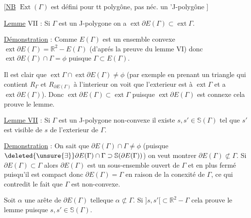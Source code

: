 [\uline{NB} $\operatorname{Ext}(\Gamma)$ est défini pour tt polygône, pas néc. un 'J-polygône ]

\uline{Lemme} VII : Si $\Gamma$ est un J-polygone on a $\operatorname{ext}\partial E(\Gamma)\subset\operatorname{ext}\Gamma$.

\uline{Démonstration} : Comme $E(\Gamma)$ est un ensemble convexe $\operatorname{ext}\partial E(\Gamma)=\mathbb{R}^{2}-E(\Gamma)$ (d'aprés la preuve du lemme VI) donc $\operatorname{ext}\partial E(\Gamma)\cap\Gamma=\phi$ puisque $\Gamma\subset E(\Gamma)$.

Il est clair que $\operatorname{ext}\Gamma\cap\operatorname{ext}\partial E(\Gamma)\ne\phi$ (par exemple en prenant un triangle qui contient $R_{\Gamma}$ et $R_{\partial E(\Gamma)}$ à l'interieur on voit que l'exterieur est  à  $\operatorname{ext}\Gamma$ et a $\operatorname{ext}\partial E(\Gamma)$). Donc $\operatorname{ext}\partial E(\Gamma)\subset\operatorname{ext}\Gamma$ puisque $\operatorname{ext}\partial E(\Gamma)$ est connexe  cela prouve le lemme.

\uline{Lemme VII} : Si $\Gamma$ est un \inserted{(}J-\inserted{)}polygone non-convexe il existe $s,s'\in\mathbb{S}(\Gamma)$ tel que  $s'$ est visible de $s$ de l'exterieur de $\Gamma$.

\uline{Demonstration} : On sait que $\partial E(\Gamma)\cap\Gamma\ne\phi$ (puisque $\deleted{\unsure{\exists}}\partial E(\Gamma)\cap\Gamma\supset\mathbb{S}(\partial E(\Gamma))$) on veut montrer  $\partial E(\Gamma)\not\subset\Gamma$. Si $\partial E(\Gamma)\subset\Gamma$ alors  $\partial E(\Gamma)$ est un sous-ensemble ouvert de $\Gamma$ et en plus fermé puisqu'il est compact donc $\partial E(\Gamma)=\Gamma$ en raison de la conexité de $\Gamma$, ce qui contredit le fait que $\Gamma$ est non-convexe.

Soit $\alpha$\inserted{$=[s,s']$} une arête de $\partial E(\Gamma)$ telleque $\alpha\not\subset\Gamma$. Si $]s,s'[\subset\mathbb{R}^{2}-\Gamma$ cela prouve le lemme puisque $s,s'\in\mathbb{S}(\Gamma)$.

